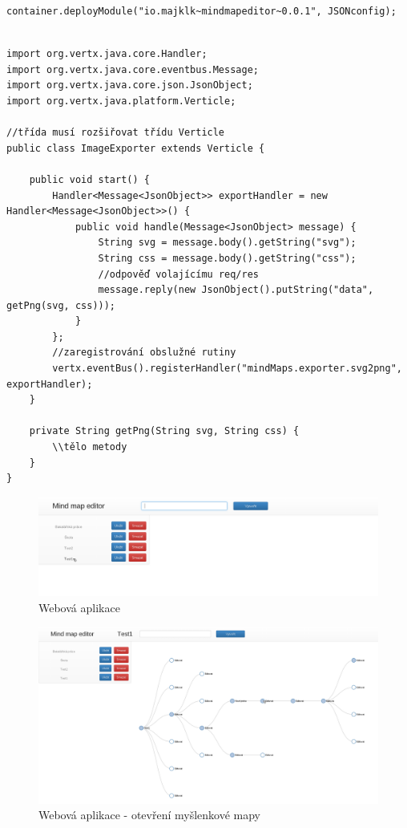 \begin{lstlisting}[caption=Spuštění modulu v jazyce Java]
container.deployModule("io.majklk~mindmapeditor~0.0.1", JSONconfig);
\end{lstlisting}

\begin{lstlisting}[caption=Verticle v jazyce Java]

import org.vertx.java.core.Handler;
import org.vertx.java.core.eventbus.Message;
import org.vertx.java.core.json.JsonObject;
import org.vertx.java.platform.Verticle;

//třída musí rozšiřovat třídu Verticle
public class ImageExporter extends Verticle {
	
	public void start() {
		Handler<Message<JsonObject>> exportHandler = new Handler<Message<JsonObject>>() {
			public void handle(Message<JsonObject> message) {
				String svg = message.body().getString("svg");
				String css = message.body().getString("css");
				//odpověď volajícímu req/res
				message.reply(new JsonObject().putString("data", getPng(svg, css)));
			}
		};
		//zaregistrování obslužné rutiny
		vertx.eventBus().registerHandler("mindMaps.exporter.svg2png", exportHandler);
	}

	private String getPng(String svg, String css) { 
		\\tělo metody
	}
}
\end{lstlisting}

\begin{figure}
\begin{centering}
\includegraphics[width	=1\textwidth]{obrazky/mindmap1}
\par\end{centering}
\caption{Webová aplikace\label{fig:midnmap1}}
\end{figure}

\begin{figure}
\begin{centering}
\includegraphics[width	=1\textwidth]{obrazky/mindmap2}
\par\end{centering}
\caption{Webová aplikace - otevření myšlenkové mapy\label{fig:midnmap2}}
\end{figure}

